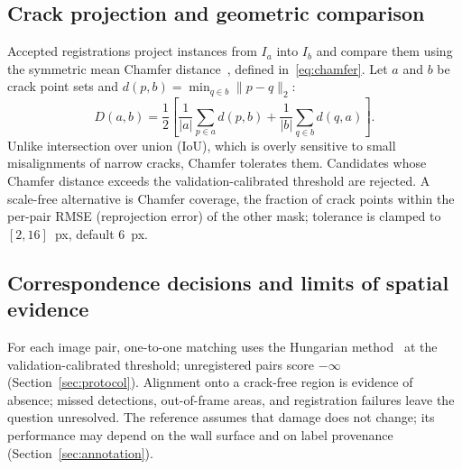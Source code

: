 \subsection{Crack projection and geometric comparison}
\label{sec:chamfer}

Accepted registrations project instances from $I_a$ into $I_b$ and compare them using the symmetric mean Chamfer distance~\cite{barrow1977chamfer}, defined in~\eqref{eq:chamfer}. Let $a$ and $b$ be crack point sets and $d(p, b)=\min_{q \in b}\lVert p-q\rVert_2$:
\begin{equation}
D(a,b)=\frac{1}{2}\left[\frac{1}{|a|}\sum_{p \in a} d(p, b)+
\frac{1}{|b|}\sum_{q \in b} d(q, a)\right].
\label{eq:chamfer}
\end{equation}
Unlike intersection over union (IoU), which is overly sensitive to small misalignments of narrow cracks, Chamfer tolerates them. Candidates whose Chamfer distance exceeds the validation-calibrated threshold are rejected.
A scale-free alternative is Chamfer coverage, the fraction of crack points within the per-pair RMSE (reprojection error) of the other mask; tolerance is clamped to $[2,16]$~px, default $6$~px.

\subsection{Correspondence decisions and limits of spatial evidence}

For each image pair, one-to-one matching uses the Hungarian method~\cite{kuhn1955hungarian} at the validation-calibrated threshold; unregistered pairs score $-\infty$ (Section~\ref{sec:protocol}).
Alignment onto a crack-free region is evidence of absence; missed detections, out-of-frame areas, and registration failures leave the question unresolved.
The reference assumes that damage does not change; its performance may depend on the wall surface and on label provenance (Section~\ref{sec:annotation}).
